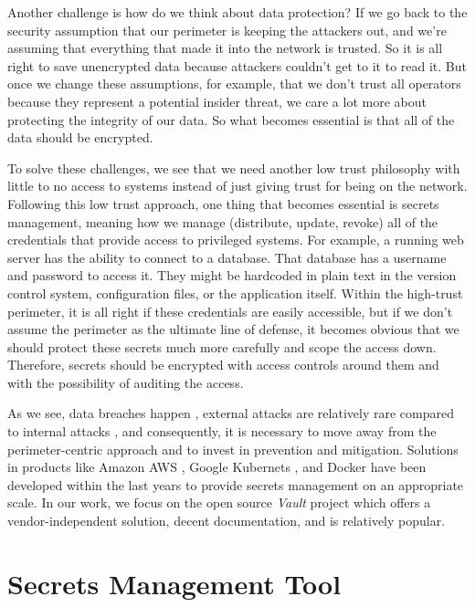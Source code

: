 \documentclass[runningheads]{llncs}
\begin{document}
Another challenge is how do we think about data protection? If we go back to the security assumption that our perimeter is keeping the attackers out, and we're assuming that everything that made it into the network is trusted. So it is all right to save unencrypted data because attackers couldn't get to it to read it. But once we change these assumptions, for example, that we don't trust all operators because they represent a potential insider threat, we care a lot more about protecting the integrity of our data. So what becomes essential is that all of the data should be encrypted.

To solve these challenges, we see that we need another low trust philosophy with little to no access to systems instead of just giving trust for being on the network. Following this low trust approach, one thing that becomes essential is secrets management, meaning how we manage (distribute, update, revoke) all of the credentials that provide access to privileged systems. For example, a running web server has the ability to connect to a database. That database has a username and password to access it. They might be hardcoded in plain text in the version control system, configuration files, or the application itself. Within the high-trust perimeter, it is all right if these credentials are easily accessible, but if we don't assume the perimeter as the ultimate line of defense, it becomes obvious that we should protect these secrets much more carefully and scope the access down. Therefore, secrets should be encrypted with access controls around them and with the possibility of auditing the access.

As we see, data breaches happen \cite{ref_url_guardian}, external attacks are relatively rare compared to internal attacks \cite{ref_url_verizon}, and consequently, it is necessary to move away from the perimeter-centric approach and to invest in prevention and mitigation. Solutions in products like Amazon AWS \cite{ref_url_aws}, Google Kubernets \cite{ref_url_gl}, and Docker \cite{ref_url_docker} have been developed within the last years to provide secrets management on an appropriate scale. In our work, we focus on the open source \textit{Vault} project \cite{ref_url_vault} which offers a vendor-independent solution, decent documentation, and is relatively popular.

\section{Secrets Management Tool}
\end{document}
